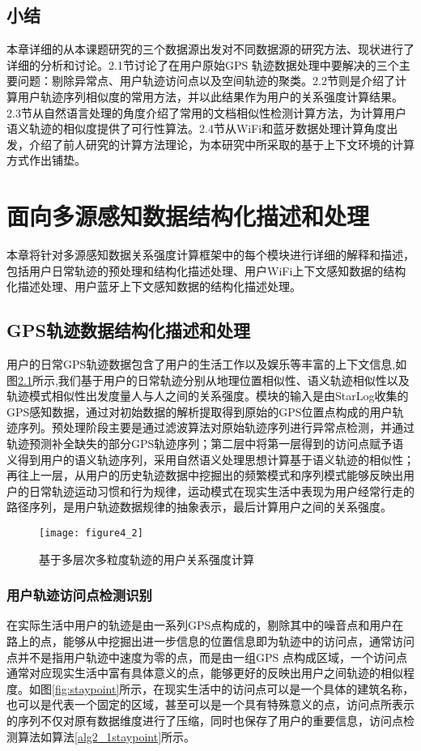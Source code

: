 \section{小结}
\label{sec:section2-4}
本章详细的从本课题研究的三个数据源出发对不同数据源的研究方法、现状进行了详细的分析和讨论。2.1节讨论了在用户原始GPS 轨迹数据处理中要解决的三个主要问题：剔除异常点、用户轨迹访问点以及空间轨迹的聚类。2.2节则是介绍了计算用户轨迹序列相似度的常用方法，并以此结果作为用户的关系强度计算结果。2.3节从自然语言处理的角度介绍了常用的文档相似性检测计算方法，为计算用户语义轨迹的相似度提供了可行性算法。2.4节从WiFi和蓝牙数据处理计算角度出发，介绍了前人研究的计算方法理论，为本研究中所采取的基于上下文环境的计算方式作出铺垫。


\chapter{面向多源感知数据结构化描述和处理}
\label{chap:chapter03}
本章将针对多源感知数据关系强度计算框架中的每个模块进行详细的解释和描述，包括用户日常轨迹的预处理和结构化描述处理、用户WiFi上下文感知数据的结构化描述处理、用户蓝牙上下文感知数据的结构化描述处理。
\section{GPS轨迹数据结构化描述和处理}
\label{sec:section3-1}
用户的日常GPS轨迹数据包含了用户的生活工作以及娱乐等丰富的上下文信息,如图\ref{fig:tramodel}所示,我们基于用户的日常轨迹分别从地理位置相似性、语义轨迹相似性以及轨迹模式相似性出发度量人与人之间的关系强度。模块的输入是由StarLog收集的GPS感知数据，通过对初始数据的解析提取得到原始的GPS位置点构成的用户轨迹序列。预处理阶段主要是通过滤波算法对原始轨迹序列进行异常点检测，并通过轨迹预测补全缺失的部分GPS轨迹序列；第二层中将第一层得到的访问点赋予语义得到用户的语义轨迹序列，采用自然语义处理思想计算基于语义轨迹的相似性；再往上一层，从用户的历史轨迹数据中挖掘出的频繁模式和序列模式能够反映出用户的日常轨迹运动习惯和行为规律，运动模式在现实生活中表现为用户经常行走的路径序列，是用户轨迹数据规律的抽象表示，最后计算用户之间的关系强度。
\begin{figure}[htp]
\centering
\texttt{[image: figure4\_2]}
\caption{基于多层次多粒度轨迹的用户关系强度计算}
\label{fig:tramodel}
\end{figure}
\subsection{用户轨迹访问点检测识别}
在实际生活中用户的轨迹是由一系列GPS点构成的，剔除其中的噪音点和用户在路上的点，能够从中挖掘出进一步信息的位置信息即为轨迹中的访问点，通常访问点并不是指用户轨迹中速度为零的点，而是由一组GPS 点构成区域，一个访问点通常对应现实生活中富有具体意义的点，能够更好的反映出用户之间轨迹的相似程度。如图\ref{fig:staypoint}所示，在现实生活中的访问点可以是一个具体的建筑名称，也可以是代表一个固定的区域，甚至可以是一个具有特殊意义的点，访问点所表示的序列不仅对原有数据维度进行了压缩，同时也保存了用户的重要信息，访问点检测算法如算法\ref{alg2_1staypoint}所示。

